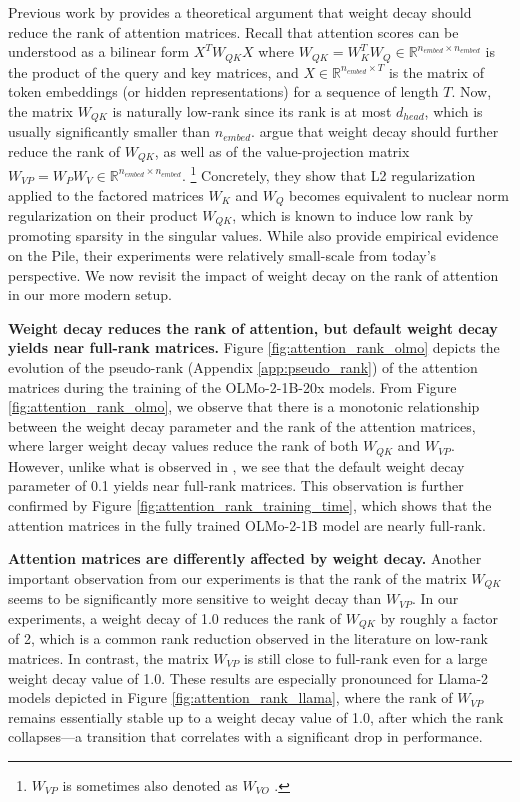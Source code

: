 Previous work by \citet{kobayashi2024wdlowrank} provides a theoretical argument that weight decay should reduce the rank of attention matrices. Recall that attention scores can be understood as a bilinear form $X^T W_{QK} X$ where $W_{QK}=W_K^T W_Q \in \mathbb{R}^{n_{embed} \times n_{embed}}$ is the product of the query and key matrices, and $X \in \mathbb{R}^{n_{embed} \times T}$ is the matrix of token embeddings (or hidden representations) for a sequence of length $T$. Now, the matrix $W_{QK}$ is naturally low-rank since its rank is at most $d_{head}$, which is usually significantly smaller than $n_{embed}$. \citet{kobayashi2024wdlowrank} argue that weight decay should further reduce the rank of $W_{QK}$, as well as of the value-projection matrix $W_{VP}=W_P W_V \in \mathbb{R}^{n_{embed} \times n_{embed}}$. 
\footnote{$W_{VP}$ is sometimes also denoted as $W_{VO}$ \citep{wang2025sharpness, wang2025muon}.} 
Concretely, they show that L2 regularization applied to the factored matrices $W_K$ and $W_Q$ becomes equivalent to nuclear norm regularization on their product $W_{QK}$, which is known to induce low rank by promoting sparsity in the singular values. While \citet{kobayashi2024wdlowrank} also provide empirical evidence on the Pile, their experiments were relatively small-scale from today’s perspective. We now revisit the impact of weight decay on the rank of attention in our more modern setup.


\textbf{Weight decay reduces the rank of attention, but default weight decay yields near full-rank matrices.} Figure \ref{fig:attention_rank_olmo} depicts the evolution of the pseudo-rank (Appendix \ref{app:pseudo_rank}) of the attention matrices during the training of the OLMo-2-1B-20x models. From Figure \ref{fig:attention_rank_olmo}, we observe that there is a monotonic relationship between the weight decay parameter and the rank of the attention matrices, where larger weight decay values reduce the rank of both $W_{QK}$ and $W_{VP}$. However, unlike what is observed in \citet{kobayashi2024wdlowrank}, we see that the default weight decay parameter of 0.1 yields near full-rank matrices.  This observation is further confirmed by Figure \ref{fig:attention_rank_training_time}, which shows that the attention matrices in the fully trained OLMo-2-1B model are nearly full-rank. 

\textbf{Attention matrices are differently affected by weight decay.} Another important observation from our experiments is that the rank of the matrix $W_{QK}$ seems to be significantly more sensitive to weight decay than $W_{VP}$. In our experiments, a weight decay of 1.0 reduces the rank of $W_{QK}$ by roughly a factor of 2, which is a common rank reduction observed in the literature on low-rank matrices. In contrast, the matrix $W_{VP}$ is still close to full-rank even for a large weight decay value of 1.0. These results are especially pronounced for Llama-2 models depicted in Figure \ref{fig:attention_rank_llama}, where the rank of $W_{VP}$ remains essentially stable up to a weight decay value of 1.0, after which the rank collapses—a transition that correlates with a significant drop in performance.

